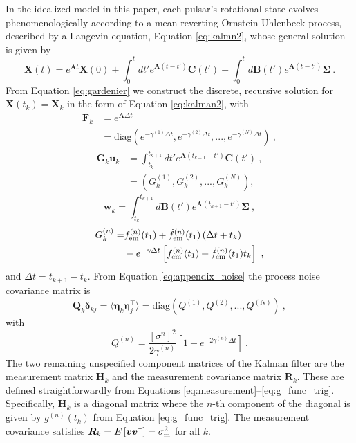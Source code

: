 \documentclass[fleqn,usenatbib,useAMS]{mnras}
\begin{document}
In the idealized model in this paper, each pulsar's rotational state evolves phenomenologically according to a mean-reverting Ornstein-Uhlenbeck process, described by a Langevin equation, Equation \eqref{eq:kalmn2}, whose general solution is given by \citep{gardiner2009stochastic}
\begin{equation}
	\boldsymbol{X}(t) = e^{\boldsymbol{A} t} \boldsymbol{X}(0) + \int_0^t dt'  e^{\boldsymbol{A}(t-t')} \boldsymbol{C}(t') + \int_0^t d\boldsymbol{B}(t') e^{\boldsymbol{A}(t-t')} \boldsymbol{\Sigma}  \ . \label{eq:gardenier}
\end{equation} 
From Equation \eqref{eq:gardenier} we construct the discrete, recursive solution for $\boldsymbol{X}(t_k) = \boldsymbol{X}_k$ in the form of Equation \eqref{eq:kalman2}, with
\begin{align}
	\boldsymbol{F}_k &= e^{\boldsymbol{A} \Delta t } \  \\
	&= \text{diag}\left(e^{- \gamma^{(1)} \Delta t},e^{- \gamma^{(2)} \Delta t},...,e^{- \gamma^{(N)} \Delta t} \right) \ ,
\end{align}
\begin{align}
	\boldsymbol{G}_k \boldsymbol{u}_k &= \int_{t_k}^{t_{k+1}} dt' e^{\boldsymbol{A}\left( t_{k+1} - t' \right)}  \boldsymbol{C}(t')  \ , \\
	&= \left(G^{(1)}_k, G^{(2)}_k,...,G^{(N)}_k \right) ,
\end{align}
\begin{equation}
	\boldsymbol{w}_k = \int_{t_k}^{t_{k+1}} d \boldsymbol{B}(t') e^{\boldsymbol{A}\left( t_{k+1} - t' \right)} \boldsymbol{\Sigma}  \ ,  \label{eq:appendix_noise}
\end{equation}
\begin{align}
	G_k^{(n)} =&    f^{(n)}_{\rm em}(t_1) + \dot{f}^{(n)}_{\rm em}(t_1)  \left(\Delta t + t_k \right) \nonumber \\ 
	&- e^{-\gamma \Delta t} \left[  f^{(n)}_{\rm em}(t_1) +\dot{f}^{(n)}_{\rm em}(t_1)  t_k \right] \ ,
\end{align}
and $\Delta t = t_{k+1} - t_k$. From Equation \eqref{eq:appendix_noise} the process noise covariance matrix is
\begin{equation}
	\boldsymbol{Q}_k \boldsymbol{\delta}_{kj}= \langle \boldsymbol{\eta}_k \boldsymbol{\eta}_j^\intercal \rangle = \text{diag} \left(Q^{(1)}, Q^{(2)},...,Q^{(N)}\right) \ ,
\end{equation}
with 
\begin{equation}
Q^{(n)} = \frac{[\sigma^{n}]^2}{2 \gamma^{(n)}} \left[ 1 - e^{-2 \gamma^{(n)} \Delta t}\right] \ .
\end{equation}
The two remaining unspecified component matrices of the Kalman filter are the measurement matrix $\boldsymbol{H}_k$ and the measurement covariance matrix $\boldsymbol{R}_k$. These are defined straightforwardly from Equations \eqref{eq:measurement}--\eqref{eq:g_func_trig}. Specifically, 
$\boldsymbol{H}_k$ is a diagonal matrix where the $n$-th component of the diagonal is given by $g^{(n)}(t_k)$ from Equation \eqref{eq:g_func_trig}. The measurement covariance satisfies $\boldsymbol{R}_k = E \left[ \boldsymbol{v} \boldsymbol{v}^\intercal \right] = \sigma^2_{\rm m}$ for all $k$.
\end{document}
